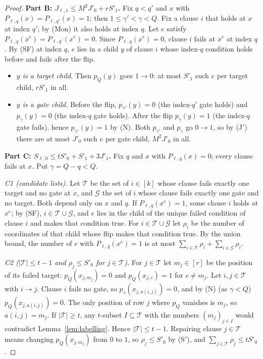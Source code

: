 \documentclass[11pt]{article}
\theoremstyle{definition}
\theoremstyle{remark}
\begin{document}
\begin{proof}
\smallskip\noindent\textbf{Part B: $J_{\ell,1}\le M^2J'_0+rS'_1$.}
Fix $q<q'$ and $x$ with $P_{\ell,q}(x)=P_{\ell,q'}(x)=1$; then
$1\le\gamma'<\gamma<Q$. Fix a clause $i$ that holds at $x$ at index $q'$; by
(Mon) it also holds at index $q$. Let $e$ satisfy
$P_{\ell,q}(x^e)=P_{\ell,q'}(x^e)=0$. Since $P_{\ell,q}(x^e)=0$, clause $i$
fails at $x^e$ at index $q$. By (SF) at index $q$, $e$ lies in a child $y$ of
clause $i$ whose index-$q$ condition holds before and fails after the flip.
\begin{itemize}[leftmargin=*,itemsep=1pt]
\item \emph{$y$ is a target child.} Then $p_Q(y)$ goes $1\to0$: at most
 $S'_1$ such $e$ per target child, $rS'_1$ in all.
\item \emph{$y$ is a gate child.} Before the flip, $p_{\gamma'}(y)=0$ (the
 index-$q'$ gate holds) and $p_\gamma(y)=0$ (the index-$q$ gate holds). After
 the flip $p_\gamma(y)=1$ (the index-$q$ gate fails), hence
 $p_{\gamma'}(y)=1$ by (N). Both $p_{\gamma'}$ and $p_\gamma$ go $0\to1$, so
 by (J$'$) there are at most $J'_0$ such $e$ per gate child, $M^2J'_0$ in all.
\end{itemize}

\smallskip\noindent\textbf{Part C: $S_{\ell,0}\le tS'_0+S'_1+3J'_1$.}
Fix $q$ and $x$ with $P_{\ell,q}(x)=0$; every clause fails at $x$. Put
$\gamma=Q-q<Q$.

\emph{C1 (candidate lists).} Let $\mathcal T$ be the set of $i\in[k]$ whose
clause fails exactly one target and no gate at $x$, and $\mathcal G$ the set
of $i$ whose clause fails exactly one gate and no target. Both depend only on
$x$ and $q$. If $P_{\ell,q}(x^e)=1$, some clause $i$ holds at $x^e$; by (SF),
$i\in\mathcal T\cup\mathcal G$, and $e$ lies in the child of the unique failed
condition of clause $i$ and makes that condition true. For
$i\in\mathcal T\cup\mathcal G$ let $\rho_i$ be the number of coordinates of
that child whose flip makes that condition true. By the union bound, the
number of $e$ with $P_{\ell,q}(x^e)=1$ is at most
$\sum_{i\in\mathcal T}\rho_i+\sum_{i\in\mathcal G}\rho_i$.

\emph{C2 ($|\mathcal T|\le t-1$ and $\rho_j\le S'_0$ for
$j\in\mathcal T$).} For $j\in\mathcal T$ let $m_j\in[r]$ be the position of
its failed target: $p_Q(x_{j,m_j})=0$ and $p_Q(x_{j,c})=1$ for $c\ne m_j$.
Let $i,j\in\mathcal T$ with $i\to j$. Clause $i$ fails no gate, so
$p_\gamma(x_{j,a(i,j)})=0$, and by (N) (as $\gamma<Q$)
$p_Q(x_{j,a(i,j)})=0$. The only position of row $j$ where $p_Q$ vanishes is
$m_j$, so $a(i,j)=m_j$. If $|\mathcal T|\ge t$, any $t$-subset
$I\subseteq\mathcal T$ with the numbers $(m_j)_{j\in I}$ would contradict
Lemma~\ref{lem:labelling}. Hence $|\mathcal T|\le t-1$. Repairing clause
$j\in\mathcal T$ means changing $p_Q(x_{j,m_j})$ from $0$ to $1$, so
$\rho_j\le S'_0$ by (S$'$), and
$\sum_{j\in\mathcal T}\rho_j\le tS'_0$.


\end{proof}
\end{document}
